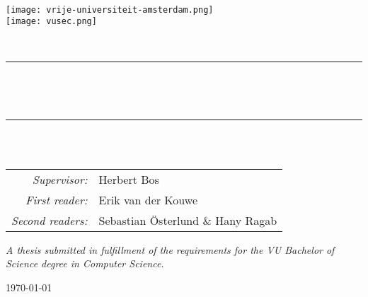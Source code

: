 \begin{titlepage}
    \newcommand{\HRule}{\rule{0.8\linewidth}{0.2mm}}

    \centering

    \vspace*{1em}
    \textsc{\large \theinstitution}\\[1em]

    \texttt{[image: vrije-universiteit-amsterdam.png]} \\[2em]
    \texttt{[image: vusec.png]}

    \vspace{4em}
    \textsc{\Large \thesubject}\\
    \vspace{4em}

    \HRule\\[0.7cm]

    \begin{minipage}{0.75\textwidth}
      \centering
      \setlength{\baselineskip}{2em}
      {\LARGE\bfseries \thetitle}\\[1em]
      \vspace{1em}
    \end{minipage}

    \HRule\\[1.5cm]

    {\Large \theauthor}\\
    \vspace{2em}
    \begin{minipage}{0.72\textwidth}
      \large
      \centering
      \begin{tabular}{ r l }
        \textit{Supervisor:}        & Herbert Bos \\
        \textit{First reader:}     & Erik van der Kouwe \\
        \textit{Second readers:} & Sebastian \"{O}sterlund \& Hany Ragab
      \end{tabular}
    \end{minipage}

    \vfill
    \begin{minipage}{0.8\textwidth}
      \centering
      \textit{\large
        A thesis submitted in fulfillment of the requirements for the VU Bachelor of Science degree in Computer Science.
      }
    \end{minipage}

    \vspace{2em}
    {\large\today}

    \vspace{4em}
\end{titlepage}
